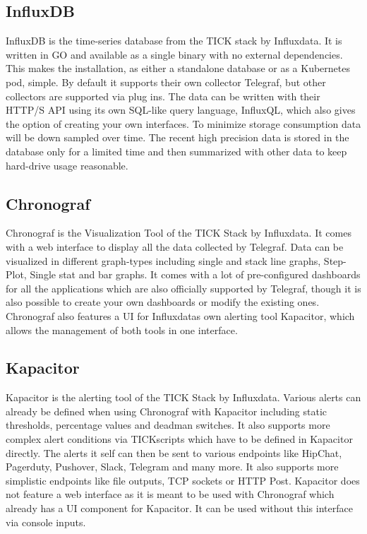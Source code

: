 \subsection{InfluxDB}
InfluxDB is the time-series database from the TICK stack by Influxdata. It is written in GO and available as a single binary with no external dependencies. This makes the installation, as either a standalone database or as a Kubernetes pod, simple.
By default it supports their own collector Telegraf, but other collectors are supported via plug ins. The data can be written with their  HTTP/S API using its own SQL-like query language, InfluxQL, which also gives the option of creating your own interfaces.
To minimize storage consumption data will be down sampled over time. The recent high precision data is stored in the database only for a limited time and then summarized with other data to keep hard-drive usage reasonable. 
\subsection{Chronograf}
Chronograf is the Visualization Tool of the TICK Stack by Influxdata. It comes with a web interface to display all the data collected by Telegraf. Data can be visualized in different graph-types including single and stack line graphs, Step-Plot, Single stat and bar graphs. It comes with a lot of pre-configured dashboards for all the applications which are also officially supported by Telegraf, though it is also possible to create your own dashboards or modify the existing ones. 
Chronograf also features a UI for Influxdatas own alerting tool Kapacitor, which allows the management of both tools in one interface.
\subsection{Kapacitor}
Kapacitor is the alerting tool of the TICK Stack by Influxdata. Various alerts can already be defined when using Chronograf with Kapacitor including static thresholds, percentage values and deadman switches. It also supports more complex alert conditions via TICKscripts which have to be defined in Kapacitor directly.
The alerts it self can then be sent to various endpoints like HipChat, Pagerduty, Pushover, Slack, Telegram and many more. It also supports more simplistic endpoints like file outputs, TCP sockets or HTTP Post.
Kapacitor does not feature a web interface as it is meant to be used with Chronograf which already has a UI component for Kapacitor. It can be used without this interface via console inputs.
